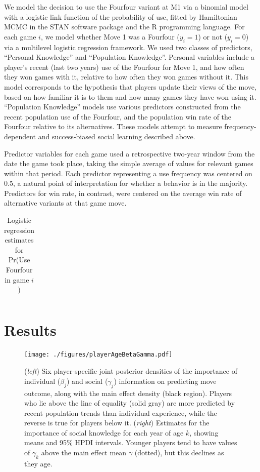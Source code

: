 \documentclass[reqno,12pt]{amsart}
\begin{document}
We model the decision to use the Fourfour variant at M1 via a binomial model with a logistic link function of the probability of use, fitted by Hamiltonian MCMC in the STAN software package \citep{stan2013stan} and the R programming language. For each game $i$, we model whether Move 1 was a Fourfour ($y_i=1$) or not ($y_i=0$) via a multilevel logistic regression framework. We used two classes of predictors, ``Personal Knowledge'' and ``Population Knowledge''. Personal variables include a player's recent (last two years) use of the Fourfour for Move 1, and how often they won games with it, relative to how often they won games without it. This model corresponds to the hypothesis that players update their views of the move, based on how familiar it is to them and how many games they have won using it. ``Population Knowledge'' models use various predictors constructed from the recent population use of the Fourfour, and the population win rate of the Fourfour relative to its alternatives. These models attempt to measure frequency-dependent and success-biased social learning described above.

Predictor variables for each game used a retrospective two-year window from the date the game took place, taking the simple average of values for relevant games within that period. Each predictor representing a use frequency was centered on 0.5, a natural point of interpretation for whether a behavior is in the majority. Predictors for win rate, in contrast, were centered on the average win rate of alternative variants at that game move.

\begin{table}[t]
  \centering
    \begin{tabular}{lrr}
    
    \end{tabular}
  \caption{Logistic regression estimates for Pr(Use Fourfour in game $i$)}
  \label{table:pr44_logistic_coefs}
\end{table}

\section{Results}

\begin{figure}[t]
  \begin{center}
    \texttt{[image: ./figures/playerAgeBetaGamma.pdf]}
    \caption{(\textit{left}) Six player-specific joint posterior densities of the importance of individual ($\beta_j$) and social ($\gamma_j$) information on predicting move outcome, along with the main effect density (black region). Players who lie above the line of equality (solid gray) are more predicted by recent population trends than individual experience, while the reverse is true for players below it. (\textit{right}) Estimates for the importance of social knowledge for each year of age $k$, showing means and 95\% HPDI intervals. Younger players tend to have values of $\gamma_k$ above the main effect mean $\gamma$ (dotted), but this declines as they age.}
  \label{fig:playerAgeBetaGamma}
  \end{center}
\end{figure}
\end{document}
